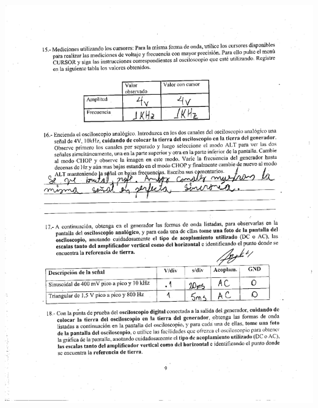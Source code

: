 \documentclass[12pt]{article}
\begin{document}
	\begin{center}
		\includegraphics[width=16cm,height=20cm]{Img/anex_lab_4_0005}
	\end{center}
	
\end{document}

